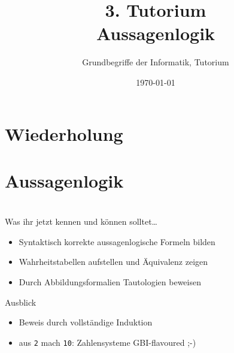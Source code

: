 




\title[Aussagenlogik]{3. Tutorium\\ Aussagenlogik}
\subtitle{Grundbegriffe der Informatik, Tutorium \hashtag\mytutnumber}
\date{\today}
\usepackage{tikz}


\titleframe
\roadmap

\section{Wiederholung}



\section{Aussagenlogik}




\section{}
	\begin{frame}{Was ihr jetzt kennen und können solltet\dots}
			\begin{itemize}
				\item Syntaktisch korrekte aussagenlogische Formeln bilden
				\item Wahrheitstabellen aufstellen und Äquivalenz zeigen
				\item Durch Abbildungsformalien Tautologien beweisen
			\end{itemize}
	
	\end{frame}
\begin{frame}[fragile]{Ausblick}
 		\begin{itemize}
 			\item Beweis durch vollständige Induktion
 			\item aus \verb+2+ mach \verb+10+: Zahlensysteme GBI-flavoured ;-)
 		\end{itemize}
\end{frame}
\section{}
\questionframe
\lastframe
{}
